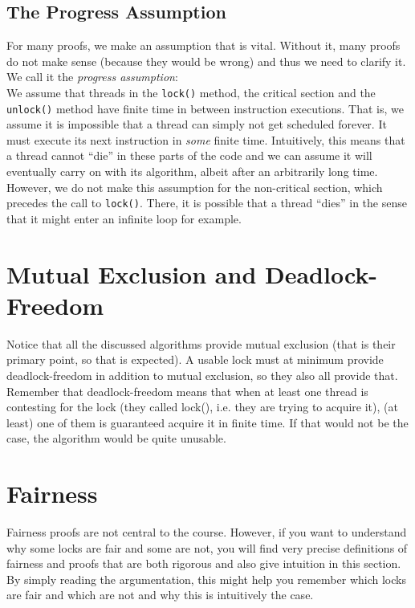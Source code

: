\documentclass{article}
\begin{document}
    \subsection{The Progress Assumption}
    For many proofs, we make an assumption that is vital. Without it, many proofs do not make sense (because they would be wrong) and thus we need to clarify it. We call it the \textit{progress assumption}:\\
    We assume that threads in the \texttt{lock()} method, the critical section and the \texttt{unlock()} method have finite time in between instruction executions. That is, we assume it is impossible that a thread can simply not get scheduled forever. It must execute its next instruction in \textit{some} finite time. Intuitively, this means that a thread cannot ``die'' in these parts of the code and we can assume it will eventually carry on with its algorithm, albeit after an arbitrarily long time. However, we do not make this assumption for the non-critical section, which precedes the call to \texttt{lock()}. There, it is possible that a thread ``dies'' in the sense that it might enter an infinite loop for example.

    \section{Mutual Exclusion and Deadlock-Freedom}
    Notice that all the discussed algorithms provide mutual exclusion (that is their primary point, so that is expected). A usable lock must at minimum provide deadlock-freedom in addition to mutual exclusion, so they also all provide that. Remember that deadlock-freedom means that when at least one thread is contesting for the lock (they called lock(), i.e. they are trying to acquire it), (at least) one of them is guaranteed acquire it in finite time. If that would not be the case, the algorithm would be quite unusable.

    \section{Fairness}
    Fairness proofs are not central to the course. However, if you want to understand why some locks are fair and some are not, you will find very precise definitions of fairness and proofs that are both rigorous and also give intuition in this section. By simply reading the argumentation, this might help you remember which locks are fair and which are not and why this is intuitively the case.
\end{document}
